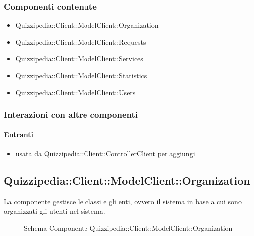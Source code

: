 \subsubsection{Componenti contenute}
\begin{itemize}
\item Quizzipedia::Client::ModelClient::Organization
\item Quizzipedia::Client::ModelClient::Requests
\item Quizzipedia::Client::ModelClient::Services
\item Quizzipedia::Client::ModelClient::Statistics
\item Quizzipedia::Client::ModelClient::Users
\end{itemize}
\subsubsection{Interazioni con altre componenti}
\paragraph{Entranti}
\begin{itemize}
\item usata da Quizzipedia::Client::ControllerClient per aggiungi
\end{itemize}
\subsection{Quizzipedia::Client::ModelClient::Organization}
La componente gestisce le classi e gli enti, ovvero il sistema in base a cui sono organizzati gli utenti nel sistema.
\begin{figure}[H]
\centering
\noindent{}
\caption[Schema Componente Quizzipedia::Client::ModelClient::Organization]{Schema Componente Quizzipedia::Client::ModelClient::Organization}
\end{figure}
